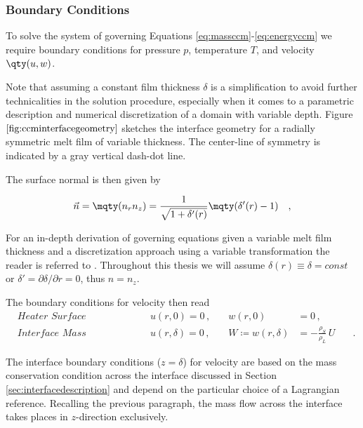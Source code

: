 \subsubsection{Boundary Conditions}

To solve the system of governing Equations \ref{eq:massccm}-\ref{eq:energyccm} we require boundary conditions for pressure $p$, temperature $T$, and velocity $\qty(u,w)$. 

Note that assuming a constant film thickness $\delta$ is a simplification to avoid further technicalities in the solution procedure, especially when it comes to a parametric description and numerical discretization of a domain with variable depth.  
Figure $\ref{fig:ccminterfacegeometry}$ sketches the interface geometry for a radially symmetric melt film of variable thickness. The center-line of symmetry is indicated by a gray vertical dash-dot line.

The surface normal is then given by

\begin{equation}
    \Vec{n} = \mqty(n_r \\ n_z) = \frac{1}{\sqrt{1 + \delta'(r)}}\mqty(\delta'(r) \\ -1) \quad ,
\end{equation}

For an in-depth derivation of governing equations given a variable melt film thickness and a discretization approach using a variable transformation the reader is referred to \cite{schuller2017spatially}. Throughout this thesis we will assume $\delta(r)\equiv \delta = \textit{const}$ or $\delta'=\partial\delta / \partial r = 0$, thus $n = n_z$. 

The boundary conditions for velocity then read
\begin{subequations}\label{eq:ccmvelocityboundary}
\begin{flalign}
     &\textit{Heater Surface} && u(r,0) = 0\,, \quad &w(r,0) &= 0\,, & \\
     &\textit{Interface Mass Conservation} && u(r,\delta) = 0\,, \quad & W \coloneqq w(r, \delta) &= -\frac{\rho_S}{\rho_L}\,U & \quad .
\end{flalign}
\end{subequations}

The interface boundary conditions ($z=\delta$) for velocity are based on the mass conservation condition across the interface discussed in Section \ref{sec:interfacedescription} and depend on the particular choice of a Lagrangian reference. Recalling the previous paragraph, the mass flow across the interface takes places in $z$-direction exclusively.


